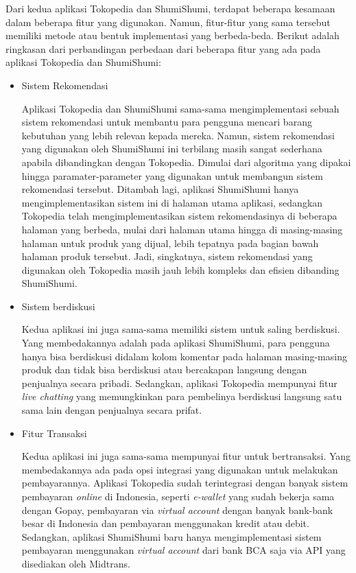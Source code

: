 \documentclass[a4paper]{article}
\begin{document}
\begin{itemize}
\begin{enumerate}
        Dari kedua aplikasi Tokopedia dan ShumiShumi, terdapat beberapa kesamaan dalam beberapa fitur yang digunakan. Namun, fitur-fitur yang sama tersebut memiliki metode atau bentuk implementasi yang berbeda-beda. Berikut adalah ringkasan dari perbandingan perbedaan dari beberapa fitur yang ada pada aplikasi Tokopedia dan ShumiShumi:

        \begin{itemize}
            \item Sistem Rekomendasi
            
            Aplikasi Tokopedia dan ShumiShumi sama-sama mengimplementasi sebuah sistem rekomendasi untuk membantu para pengguna mencari barang kebutuhan yang lebih relevan kepada mereka. Namun, sistem rekomendasi yang digunakan oleh ShumiShumi ini terbilang masih sangat sederhana apabila dibandingkan dengan Tokopedia. Dimulai dari algoritma yang dipakai hingga paramater-parameter yang digunakan untuk membangun sistem rekomendasi tersebut. Ditambah lagi, aplikasi ShumiShumi hanya mengimplementasikan sistem ini di halaman utama aplikasi, sedangkan Tokopedia telah mengimplementasikan sistem rekomendasinya di beberapa halaman yang berbeda, mulai dari halaman utama hingga di masing-masing halaman untuk produk yang dijual, lebih tepatnya pada bagian bawah halaman produk tersebut. Jadi, singkatnya, sistem rekomendasi yang digunakan oleh Tokopedia masih jauh lebih kompleks dan efisien dibanding ShumiShumi.

            \item Sistem berdiskusi
            
            Kedua aplikasi ini juga sama-sama memiliki sistem untuk saling berdiskusi. Yang membedakannya adalah pada aplikasi ShumiShumi, para pengguna hanya bisa berdiskusi didalam kolom komentar pada halaman masing-masing produk dan tidak bisa berdiskusi atau bercakapan langsung dengan penjualnya secara pribadi. Sedangkan, aplikasi Tokopedia mempunyai fitur \textit{live chatting} yang memungkinkan para pembelinya berdiskusi langsung satu sama lain dengan penjualnya secara prifat.

            \item Fitur Transaksi
            
            Kedua aplikasi ini juga sama-sama mempunyai fitur untuk bertransaksi. Yang membedakannya ada pada opsi integrasi yang digunakan untuk melakukan pembayarannya. Aplikasi Tokopedia sudah terintegrasi dengan banyak sistem pembayaran \textit{online} di Indonesia, seperti \textit{e-wallet} yang sudah bekerja sama dengan Gopay, pembayaran via \textit{virtual account} dengan banyak bank-bank besar di Indonesia dan pembayaran menggunakan kredit atau debit. Sedangkan, aplikasi ShumiShumi baru hanya mengimplementasi sistem pembayaran menggunakan \textit{virtual account} dari bank BCA saja via API yang disediakan oleh Midtrans.


\end{itemize}
\end{enumerate}
\end{itemize}
\end{document}
